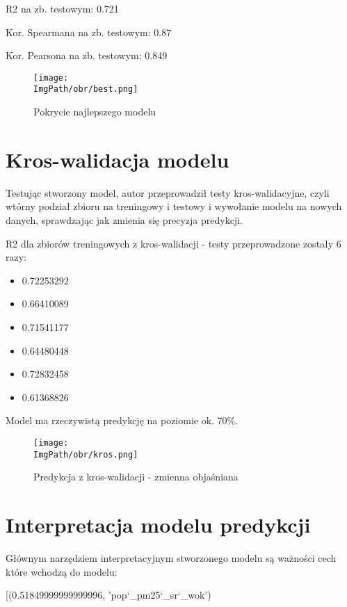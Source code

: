 \documentclass[a4paper,12pt,twoside,openany]{report}
\newcommand{\ImgPath}{.}
\begin{document}
R2 na zb. testowym: 0.721

Kor. Spearmana na zb. testowym: 0.87

Kor. Pearsona na zb. testowym: 0.849

\begin{figure}[H]
	\begin{center}
		\centering
		\texttt{[image: \\ImgPath/obr/best.png]}
	\end{center}
	\caption{Pokrycie najlepszego modelu}
	\label{best}
\end{figure}

\section{Kros-walidacja modelu}

Testując stworzony model, autor przeprowadził testy kros-walidacyjne, czyli wtórny podział zbioru na treningowy i testowy i wywołanie modelu na nowych danych, sprawdzając jak zmienia się precyzja predykcji.

R2 dla zbiorów treningowych z kros-walidacji - testy przeprowadzone zostały 6 razy:

\begin{itemize}
	\item 0.72253292
	\item 0.66410089
	\item 0.71541177
	\item 0.64480448
	\item 0.72832458
	\item 0.61368826
\end{itemize}

Model ma rzeczywistą predykcję na poziomie ok. 70\%.

\begin{figure}[H]
	\begin{center}
		\centering
		\texttt{[image: \\ImgPath/obr/kros.png]}
	\end{center}
	\caption{Predykcja z kros-walidacji - zmienna objaśniana}
	\label{kros}
\end{figure}

\section{Interpretacja modelu predykcji}

Głównym narzędziem interpretacyjnym stworzonego modelu są ważności cech które wchodzą do modelu:

[(0.51849999999999996, 'pop\char`_pm25\char`_sr\char`_wok')
\end{document}
